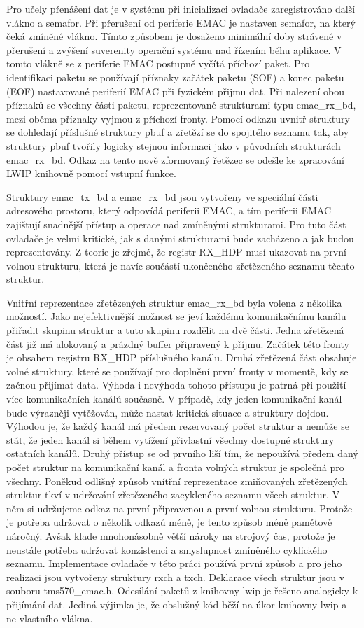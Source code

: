 Pro učely přenášení dat je v systému při inicializaci ovladače zaregistrováno další vlákno a semafor.
Při přerušení od periferie EMAC je nastaven semafor, na který čeká zmíněné vlákno.
Tímto způsobem je dosaženo minimální doby strávené v přerušení a zvýšení suverenity operační systému nad řízením běhu aplikace.
V tomto vlákně se z periferie EMAC postupně vyčítá příchozí paket.
Pro identifikaci paketu se používají příznaky začátek paketu (SOF) a konec paketu (EOF) nastavované periferií EMAC při fyzickém přijmu dat.
Při nalezení obou příznaků se všechny části paketu, reprezentované strukturami typu emac\_rx\_bd, mezi oběma příznaky vyjmou z příchozí fronty.
Pomocí odkazu uvnitř struktury se dohledají příslušné struktury pbuf a zřetězí se do spojitého seznamu tak, aby struktury pbuf tvořily logicky stejnou informaci jako v původních strukturách emac\_rx\_bd.
Odkaz na tento nově zformovaný řetězec se odešle ke zpracování LWIP knihovně pomocí vstupní funkce.

Struktury emac\_tx\_bd a emac\_rx\_bd jsou vytvořeny ve speciální části adresového prostoru, který odpovídá periferii EMAC, a tím periferii EMAC zajištují snadnější přístup a operace nad zmíněnými strukturami.
Pro tuto část ovladače je velmi kritické, jak s danými strukturami bude zacházeno a jak budou reprezentovány.
Z teorie je zřejmé, že registr RX\_HDP musí ukazovat na první volnou strukturu, která je navíc součástí ukončeného zřetězeného seznamu těchto struktur.

Vnitřní reprezentace zřetězených struktur emac\_rx\_bd byla volena z několika možností.
Jako nejefektivnější možnost se jeví každému komunikačnímu kanálu přiřadit skupinu struktur a tuto skupinu rozdělit na dvě části.
Jedna zřetězená část již má alokovaný a prázdný buffer připravený k příjmu.
Začátek této fronty je obsahem registru RX\_HDP příslušného kanálu.
Druhá zřetězená část obsahuje volné struktury, které se používají pro doplnění první fronty v momentě, kdy se začnou přijímat data.
Výhoda i nevýhoda tohoto přístupu je patrná při použití více komunikačních kanálů současně.
V případě, kdy jeden komunikační kanál bude výrazněji vytěžován, může nastat kritická situace a struktury dojdou.
Výhodou je, že každý kanál má předem rezervovaný počet struktur a nemůže se stát, že jeden kanál si během vytížení přivlastní všechny dostupné struktury ostatních kanálů.
Druhý přístup se od prvního liší tím, že nepoužívá předem daný počet struktur na komunikační kanál a fronta volných struktur je společná pro všechny.
Poněkud odlišný způsob vnítřní reprezentace zmiňovaných zřetězených struktur tkví v udržování zřetězeného zacykleného seznamu všech struktur.
V něm si udržujeme odkaz na první připravenou a první volnou strukturu.
Protože je potřeba udržovat o několik odkazů méně, je tento způsob méně pamětově náročný.
Avšak klade mnohonásobně větší nároky na strojový čas, protože je neustále potřeba udržovat konzistenci a smyslupnost zmíněného cyklického seznamu.
Implementace ovladače v této práci používá první způsob a pro jeho realizaci jsou vytvořeny struktury rxch a txch.
Deklarace všech struktur jsou v souboru tms570\_emac.h.
Odesílání paketů z knihovny lwip je řešeno analogicky k přijímání dat.
Jediná výjimka je, že obslužný kód běží na úkor knihovny lwip a ne vlastního vlákna.

